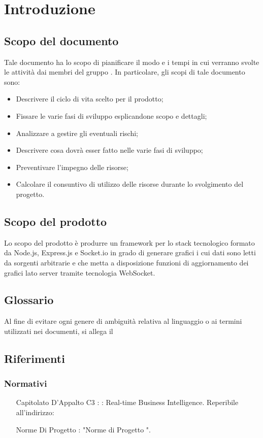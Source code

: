 \section{Introduzione}
	\subsection{Scopo del documento}
		Tale documento ha lo scopo di pianificare il modo e i tempi in cui verranno svolte le attività  dai membri del gruppo \groupname.
		In particolare, gli scopi di tale documento sono:
		\begin{itemize}
			\item Descrivere il ciclo di vita scelto per il prodotto;
			\item Fissare le varie fasi di sviluppo esplicandone scopo e dettagli;
			\item Analizzare a gestire gli eventuali rischi;
			\item Descrivere cosa dovrà  esser fatto nelle varie fasi di sviluppo;
			\item Preventivare l'impegno delle risorse;
			\item Calcolare il consuntivo di utilizzo delle risorse durante lo svolgimento del progetto.
		\end{itemize}
	\subsection{Scopo del prodotto}
		Lo scopo del prodotto è produrre un framework per lo stack tecnologico formato da Node.js, Express.js e Socket.io in grado di generare grafici i cui dati sono letti da sorgenti arbitrarie e che metta a disposizione funzioni di aggiornamento dei grafici lato server tramite tecnologia WebSocket.
	\subsection{Glossario}
		Al fine di evitare ogni genere di ambiguità relativa al linguaggio o ai termini utilizzati nei documenti, si allega il 
	\subsection{Riferimenti}
		\subsubsection{Normativi}
			\begin{itemize}
				\item[Capitolato D'Appalto C3]: \projectname: Real-time Business Intelligence. Reperibile all'indirizzo: 
				\item[Norme Di Progetto]: "Norme di Progetto \lastversion".
			\end{itemize}
